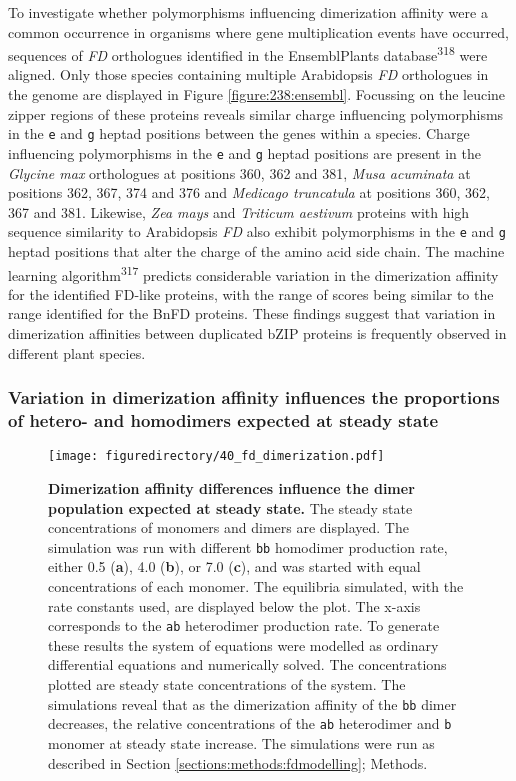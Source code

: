 \documentclass[12pt,]{book}
\begin{document}
To investigate whether polymorphisms influencing dimerization affinity
were a common occurrence in organisms where gene multiplication events
have occurred, sequences of \emph{FD} orthologues identified in the
EnsemblPlants database\textsuperscript{318} were aligned. Only those
species containing multiple Arabidopsis \emph{FD} orthologues in the
genome are displayed in Figure \ref{figure:238:ensembl}. Focussing on
the leucine zipper regions of these proteins reveals similar charge
influencing polymorphisms in the \texttt{e} and \texttt{g} heptad
positions between the genes within a species. Charge influencing
polymorphisms in the \texttt{e} and \texttt{g} heptad positions are
present in the \emph{Glycine max} orthologues at positions 360, 362 and
381, \emph{Musa acuminata} at positions 362, 367, 374 and 376 and
\emph{Medicago truncatula} at positions 360, 362, 367 and 381. Likewise,
\emph{Zea mays} and \emph{Triticum aestivum} proteins with high sequence
similarity to Arabidopsis \emph{FD} also exhibit polymorphisms in the
\texttt{e} and \texttt{g} heptad positions that alter the charge of the
amino acid side chain. The machine learning
algorithm\textsuperscript{317} predicts considerable variation in the
dimerization affinity for the identified FD-like proteins, with the
range of scores being similar to the range identified for the BnFD
proteins. These findings suggest that variation in dimerization
affinities between duplicated bZIP proteins is frequently observed in
different plant species.

\subsubsection{Variation in dimerization affinity influences the
proportions of hetero- and homodimers expected at steady
state}\label{variation-in-dimerization-affinity-influences-the-proportions-of-hetero--and-homodimers-expected-at-steady-state}

\begin{figure}[htbp]
\centering
\texttt{[image: figuredirectory/40\_fd\_dimerization.pdf]}
\caption{\textbf{Dimerization affinity differences influence the dimer
population expected at steady state.} The steady state concentrations of
monomers and dimers are displayed. The simulation was run with different
\texttt{bb} homodimer production rate, either 0.5 (\textbf{a}), 4.0
(\textbf{b}), or 7.0 (\textbf{c}), and was started with equal
concentrations of each monomer. The equilibria simulated, with the rate
constants used, are displayed below the plot. The x-axis corresponds to
the \texttt{ab} heterodimer production rate. To generate these results
the system of equations were modelled as ordinary differential equations
and numerically solved. The concentrations plotted are steady state
concentrations of the system. The simulations reveal that as the
dimerization affinity of the \texttt{bb} dimer decreases, the relative
concentrations of the \texttt{ab} heterodimer and \texttt{b} monomer at
steady state increase. The simulations were run as described in Section
\ref{sections:methods:fdmodelling};
Methods.}\label{figure:240:dimerizationmodelling}
\end{figure}
\end{document}
